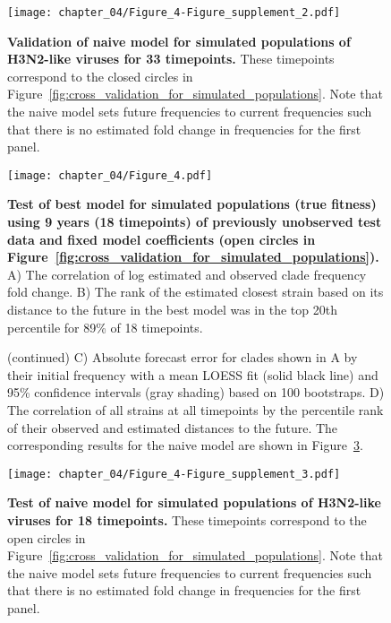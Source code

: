\begin{figure}
  \texttt{[image: chapter\_04/Figure\_4-Figure\_supplement\_2.pdf]}
  \caption[{Validation of naive model for simulated populations of H3N2-like viruses for 33 timepoints.}]{
    {\bf Validation of naive model for simulated populations of H3N2-like viruses for 33 timepoints.}
    These timepoints correspond to the closed circles in Figure~\ref{fig:cross_validation_for_simulated_populations}.
    Note that the naive model sets future frequencies to current frequencies such that there is no estimated fold change in frequencies for the first panel.
  }
  \label{fig:validation_of_naive_model_for_simulated_populations}
\end{figure}

\begin{figure}
  \texttt{[image: chapter\_04/Figure\_4.pdf]}
  \caption[{Test of best model for simulated populations (true fitness) using 9 years (18 timepoints) of previously unobserved test data and fixed model coefficients (open circles in Figure~\ref{fig:cross_validation_for_simulated_populations}).}]{
  {\bf Test of best model for simulated populations (true fitness) using 9 years (18 timepoints) of previously unobserved test data and fixed model coefficients (open circles in Figure~\ref{fig:cross_validation_for_simulated_populations}).}
  A) The correlation of log estimated and observed clade frequency fold change.
  B) The rank of the estimated closest strain based on its distance to the future in the best model was in the top 20th percentile for 89\% of 18 timepoints.
  }
  \label{fig:test_of_best_model_for_simulated_populations}
\end{figure}

\begin{figure}\ContinuedFloat
  \caption[{}]{(continued)
   C) Absolute forecast error for clades shown in A by their initial frequency with a mean LOESS fit (solid black line) and 95\% confidence intervals (gray shading) based on 100 bootstraps.
  D) The correlation of all strains at all timepoints by the percentile rank of their observed and estimated distances to the future.
  The corresponding results for the naive model are shown in Figure~\ref{fig:test_of_naive_model_for_simulated_populations}.
  }
\end{figure}

\begin{figure}
  \texttt{[image: chapter\_04/Figure\_4-Figure\_supplement\_3.pdf]}
  \caption[{Test of naive model for simulated populations of H3N2-like viruses for 18 timepoints.}]{
    {\bf Test of naive model for simulated populations of H3N2-like viruses for 18 timepoints.}
    These timepoints correspond to the open circles in Figure~\ref{fig:cross_validation_for_simulated_populations}.
    Note that the naive model sets future frequencies to current frequencies such that there is no estimated fold change in frequencies for the first panel.
  }
  \label{fig:test_of_naive_model_for_simulated_populations}
\end{figure}

